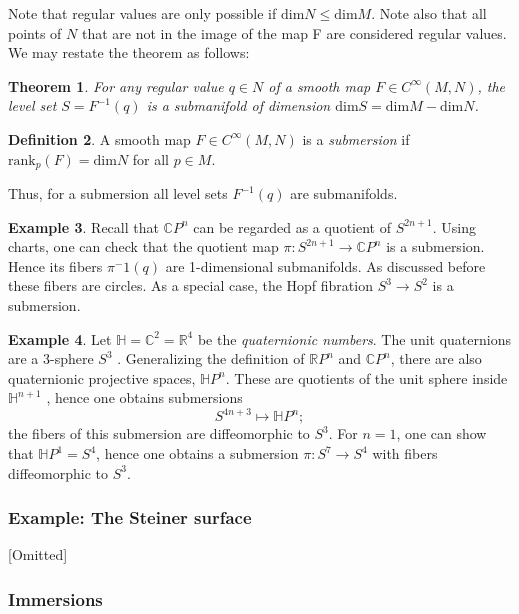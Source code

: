 \documentclass{article}
\newtheorem{theorem}{Theorem}[section]
\theoremstyle{definition}
\newtheorem{defn}[theorem]{Definition}
\newtheorem{example}[theorem]{Example}
\newenvironment{definition}
  {\vspace{8pt}\begin{mdframed}[backgroundcolor=blueish]\begin{defn}}
  {\end{defn}\end{mdframed}\vspace{4pt}}
\begin{document}
Note that regular values are only possible if $\text{dim}N \leq \text{dim}M$. Note also that all points of $N$ that are not in the image of the map F are considered regular values. We may
restate the theorem as follows:
\begin{theorem}
For any regular value $q \in N$ of a smooth map $F \in C^\infty(M,N)$, the level set $S = F^{-1}(q)$ is a submanifold of dimension $\text{dim}S = \text{dim}M - \text{dim}N$.
\end{theorem}

\begin{definition}
    A smooth map $F \in C^\infty(M,N)$ is a \textit{submersion} if $\text{rank}_p(F) = \text{dim}N$ for all $p \in M$.
    
    Thus, for a submersion all level sets $F^{-1} (q)$ are submanifolds.
\end{definition}

\begin{example}
Recall that $\mathbb CP^n$ can be regarded as a quotient of $S^{2n+1}$. Using charts, one can check that the quotient map $\pi : S^{2n+1} \rightarrow \mathbb C P^n$ is a submersion. Hence its fibers $\pi^-1 (q)$ are 1-dimensional submanifolds. As discussed before these fibers are circles. As a special case, the Hopf fibration $S^3 \rightarrow S^2$ is a submersion.
\end{example}

\begin{example}

Let $\mathbb H = \mathbb C^2 = \mathbb R^4$ be the \textit{quaternionic numbers}. The unit quaternions are a 3-sphere $S^3$ . Generalizing the definition of $\mathbb R P^n$ and $\mathbb C P^n$, there are also quaternionic projective spaces, $\mathbb H P^n$. These are quotients of the unit sphere inside $\mathbb H^{n+1}$ , hence one obtains submersions 
\[
    S^{4n+3} \mapsto \mathbb H P^n;
\]
the fibers of this submersion are diffeomorphic to $S^3$. For $n = 1$, one can show that $\mathbb HP^1 = S^4$, hence one obtains a submersion $\pi : S^7 \rightarrow S^4$ with fibers diffeomorphic to $S^3$.
\end{example}


\subsubsection{Example: The Steiner surface}

[Omitted]

\subsubsection{Immersions}
\end{document}
